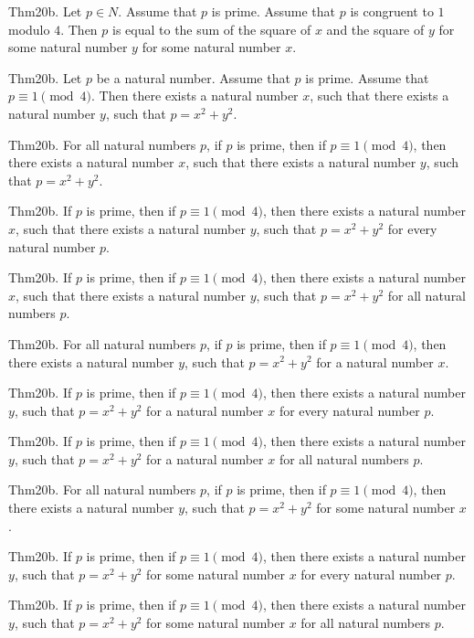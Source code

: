 \documentclass{article}
\begin{document}
Thm20b. Let $p \in N$. Assume that $p$ is prime. Assume that $p$ is congruent to $1$ modulo $4$. Then $p$ is equal to the sum of the square of $x$ and the square of $y$ for some natural number $y$ for some natural number $x$.

Thm20b. Let $p$ be a natural number. Assume that $p$ is prime. Assume that $p \equiv 1 \pmod{ 4}$. Then there exists a natural number $x$, such that there exists a natural number $y$, such that $p = x ^{ 2}+ y ^{ 2}$.

Thm20b. For all natural numbers $p$, if $p$ is prime, then if $p \equiv 1 \pmod{ 4}$, then there exists a natural number $x$, such that there exists a natural number $y$, such that $p = x ^{ 2}+ y ^{ 2}$.

Thm20b. If $p$ is prime, then if $p \equiv 1 \pmod{ 4}$, then there exists a natural number $x$, such that there exists a natural number $y$, such that $p = x ^{ 2}+ y ^{ 2}$ for every natural number $p$.

Thm20b. If $p$ is prime, then if $p \equiv 1 \pmod{ 4}$, then there exists a natural number $x$, such that there exists a natural number $y$, such that $p = x ^{ 2}+ y ^{ 2}$ for all natural numbers $p$.

Thm20b. For all natural numbers $p$, if $p$ is prime, then if $p \equiv 1 \pmod{ 4}$, then there exists a natural number $y$, such that $p = x ^{ 2}+ y ^{ 2}$ for a natural number $x$.

Thm20b. If $p$ is prime, then if $p \equiv 1 \pmod{ 4}$, then there exists a natural number $y$, such that $p = x ^{ 2}+ y ^{ 2}$ for a natural number $x$ for every natural number $p$.

Thm20b. If $p$ is prime, then if $p \equiv 1 \pmod{ 4}$, then there exists a natural number $y$, such that $p = x ^{ 2}+ y ^{ 2}$ for a natural number $x$ for all natural numbers $p$.

Thm20b. For all natural numbers $p$, if $p$ is prime, then if $p \equiv 1 \pmod{ 4}$, then there exists a natural number $y$, such that $p = x ^{ 2}+ y ^{ 2}$ for some natural number $x$.

Thm20b. If $p$ is prime, then if $p \equiv 1 \pmod{ 4}$, then there exists a natural number $y$, such that $p = x ^{ 2}+ y ^{ 2}$ for some natural number $x$ for every natural number $p$.

Thm20b. If $p$ is prime, then if $p \equiv 1 \pmod{ 4}$, then there exists a natural number $y$, such that $p = x ^{ 2}+ y ^{ 2}$ for some natural number $x$ for all natural numbers $p$.
\end{document}
